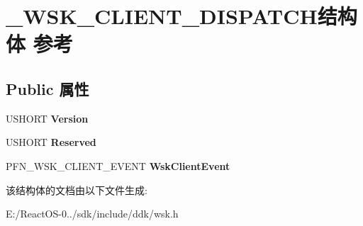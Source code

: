 \hypertarget{struct___w_s_k___c_l_i_e_n_t___d_i_s_p_a_t_c_h}{}\section{\+\_\+\+W\+S\+K\+\_\+\+C\+L\+I\+E\+N\+T\+\_\+\+D\+I\+S\+P\+A\+T\+C\+H结构体 参考}
\label{struct___w_s_k___c_l_i_e_n_t___d_i_s_p_a_t_c_h}
\subsection*{Public 属性}
\begin{DoxyCompactItemize}
\item 
\mbox{\label{struct___w_s_k___c_l_i_e_n_t___d_i_s_p_a_t_c_h_ac235584df528e9f464dfb2cff4f3bbc9}} 
U\+S\+H\+O\+RT {\bfseries Version}
\item 
\mbox{\label{struct___w_s_k___c_l_i_e_n_t___d_i_s_p_a_t_c_h_a12a2ed136929b1f86d20921e2f8ec9ff}} 
U\+S\+H\+O\+RT {\bfseries Reserved}
\item 
\mbox{\label{struct___w_s_k___c_l_i_e_n_t___d_i_s_p_a_t_c_h_aa1cbaf0443d98c756e4513b0682a0713}} 
P\+F\+N\+\_\+\+W\+S\+K\+\_\+\+C\+L\+I\+E\+N\+T\+\_\+\+E\+V\+E\+NT {\bfseries Wsk\+Client\+Event}
\end{DoxyCompactItemize}


该结构体的文档由以下文件生成\+:\begin{DoxyCompactItemize}
\item 
E\+:/\+React\+O\+S-\/0../sdk/include/ddk/wsk.\+h\end{DoxyCompactItemize}
